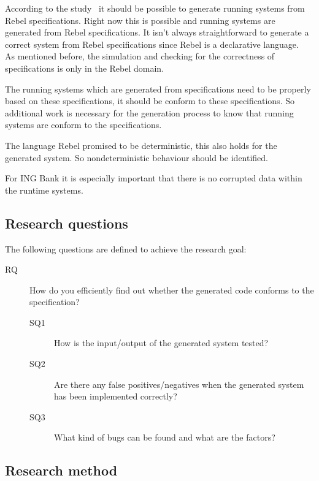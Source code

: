 According to the study~\cite[p.~3]{stoelcase} it should be possible to generate
running systems from Rebel specifications. Right now this is possible and
running systems are generated from Rebel specifications. It isn't always straightforward to generate a correct system from Rebel
specifications since Rebel is a declarative language.~\cite[p.~3]{stoelcase}
As mentioned before, the simulation and checking for the correctness of
specifications is only in the Rebel domain.

The running systems which are
generated from specifications need to be properly based on these specifications,
it should be conform to these specifications. So additional work is necessary for
the generation process to know that running systems are conform to the
specifications.

The language Rebel promised to be deterministic, this also holds
for the generated system. So nondeterministic behaviour should be identified.

For ING Bank it is especially important that there is no corrupted data within
the runtime systems.

\subsection{Research questions}\label{sec:research-questions}
The following questions are defined to achieve the research goal:

\begin{description}
  \item [RQ] How do you efficiently find out whether the generated code conforms
  to the specification?

  \begin{description}
    \item [SQ1] How is the input/output of the generated system tested?
    \item [SQ2] Are there any false positives/negatives when the generated
    system has been implemented correctly?
    \item [SQ3] What kind of bugs can be found and what are the factors?
  \end{description}

\end{description}

\subsection{Research method}\label{sec:research-method}

